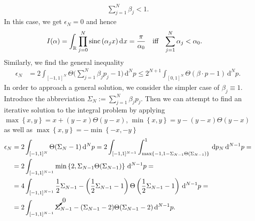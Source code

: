 \documentclass[german, parskip=full]{scrartcl}
\newcommand{\intx}{}
\newcommand{\intr}{}
\newcommand{\kla}{}
\newcommand{\klammer}{}
\newcommand{\tecxt}{}
\newcommand*{\sinc}{\text{sinc\,}}
\begin{document}
\begin{align}
\sum_{j=1}^N\beta_j<1. \label{eqn:IntegralProductSincCondition}
\end{align}
In this case, we get $\epsilon_N=0$ and hence 
\begin{align}
I(\alpha)&=\intr\int_{\mathbb{R}^{ }}\prod_{j=0}^N\sinc (\alpha_jx)\,\mathrm{d}^{ }x=\frac{\pi}{\alpha_0}&\tecxt\text{iff}&&\sum_{j=1}^N\alpha_j&<\alpha_0. \label{eqn:IntegralProductSincConditionSolution}
\end{align}
Similarly, we find the general inequality
\begin{align}
\epsilon_N&= 2\int_{[-1,1]^N}\Theta \bigg(\sum_{j=1}^N\beta_jp_j-1\bigg)\,\mathrm{d}^Np\le 2^{N+1} \int_{[0,1]^N}\Theta (\beta\cdot p - 1)\,\mathrm{d}^Np. \label{eqn:IntegralProductSincEpsilonUpperBound}
\end{align}
In order to approach a general solution, we consider the simpler case of $\beta_j\equiv 1$.
Introduce the abbreviation $\Sigma_N:=\sum_{j=1}^N\beta_jp_j$.
Then we can attempt to find an iterative solution to the integral problem by applying $\max\klammer\left\{{x,y} \right\}=x+(y-x)\Theta (y-x)$, $\min\klammer\left\{{x,y} \right\}=y-(y-x)\Theta (y-x)$ as well as $\max\klammer\left\{{x,y} \right\}=-\min\klammer\left\{{-x,-y} \right\}$
\begin{align*}
\epsilon_N&=2\intx\int_{[-1,1]^N}^{ }\Theta (\Sigma _N-1)\,\mathrm{d}^Np=2\intx\int_{[-1,1]^{N-1}}^{ }\intx\int_{\max\klammer\left\{{-1,1-\Sigma_{N-1}\Theta(\Sigma_{N-1})} \right\}}^{1}\,\mathrm{d}p_N\,\mathrm{d}^{N-1}p=\\
&=2\intx\int_{[-1,1]^{N-1}}^{ }\min\klammer\left\{{2,\Sigma_{N-1}\Theta(\Sigma_{N-1})} \right\}\,\mathrm{d}^{N-1}p=\\
&=4\intx\int_{[-1,1]^{N-1}}^{ }\frac{1}{2}\Sigma_{N-1}-\kla\left( {\frac{1}{2}\Sigma_{N-1}-1} \right)\Theta\kla\left( {\frac{1}{2}\Sigma_{N-1}-1} \right)\,\mathrm{d}^{N-1}p=\\
&=2\intx\int_{[-1,1]^{N-1}}^{ }\cancelto{\small 0}{\Sigma}_{N-1}-(\Sigma_{N-1}-2)\Theta(\Sigma_{N-1}-2)\,\mathrm{d}^{N-1}p.
\end{align*}
\end{document}
